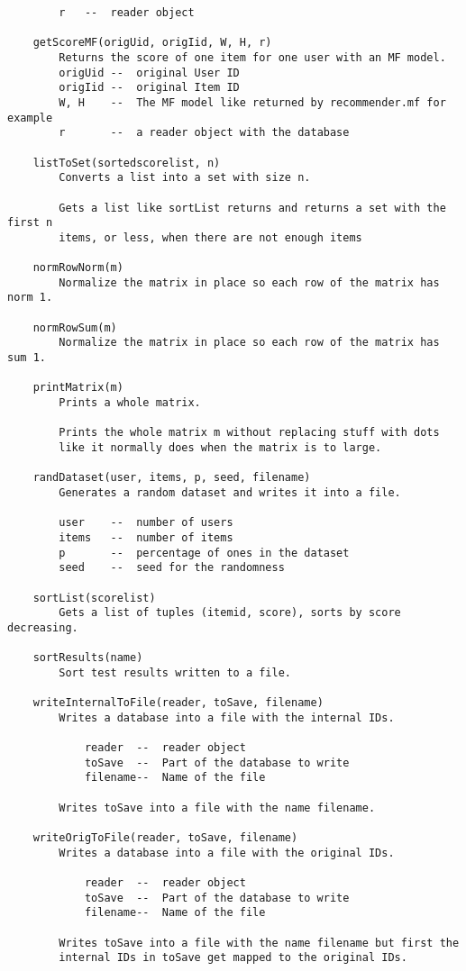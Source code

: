 \begin{lstlisting}
        r   --  reader object
    
    getScoreMF(origUid, origIid, W, H, r)
        Returns the score of one item for one user with an MF model.
        origUid --  original User ID
        origIid --  original Item ID
        W, H    --  The MF model like returned by recommender.mf for example
        r       --  a reader object with the database
    
    listToSet(sortedscorelist, n)
        Converts a list into a set with size n.
        
        Gets a list like sortList returns and returns a set with the first n
        items, or less, when there are not enough items
    
    normRowNorm(m)
        Normalize the matrix in place so each row of the matrix has norm 1.
    
    normRowSum(m)
        Normalize the matrix in place so each row of the matrix has sum 1.
    
    printMatrix(m)
        Prints a whole matrix.
        
        Prints the whole matrix m without replacing stuff with dots
        like it normally does when the matrix is to large.
    
    randDataset(user, items, p, seed, filename)
        Generates a random dataset and writes it into a file.
        
        user    --  number of users
        items   --  number of items
        p       --  percentage of ones in the dataset
        seed    --  seed for the randomness
    
    sortList(scorelist)
        Gets a list of tuples (itemid, score), sorts by score decreasing.
    
    sortResults(name)
        Sort test results written to a file.
    
    writeInternalToFile(reader, toSave, filename)
        Writes a database into a file with the internal IDs.
        
            reader  --  reader object
            toSave  --  Part of the database to write
            filename--  Name of the file
        
        Writes toSave into a file with the name filename.
    
    writeOrigToFile(reader, toSave, filename)
        Writes a database into a file with the original IDs.
        
            reader  --  reader object
            toSave  --  Part of the database to write
            filename--  Name of the file
        
        Writes toSave into a file with the name filename but first the
        internal IDs in toSave get mapped to the original IDs.
\end{lstlisting}
